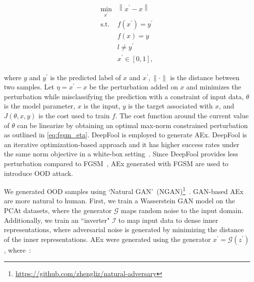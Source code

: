 \vspace{-6mm}
\begin{align}
    \begin{array}{cl}
        \min _{x^{\prime}} & \left\|x^{\prime}-x\right\| \\
        \text {s.t.} & f\left(x^{\prime}\right)=y^{\prime} \\
        & f(x)=y \\
        & l \neq y^{\prime} \\
        & x^{\prime} \in[0,1],
    \end{array}
\end{align}

\hspace*{3.5mm} where $y$ and $y^{\prime}$ is the predicted label of $x$ and $x^{\prime},\|\cdot\|$ is the distance between two samples. Let $\eta=x^{\prime}-x$ be the perturbation added on $x$ and minimizes the perturbation while misclassifying the prediction with a constraint of input data, ${\theta}$ is the model parameter, ${x}$ is the input, $y$ is the target associated with ${x}$, and $J(\theta, x,y)$ is the cost used to train $f$. The cost function around the current value of ${\theta}$ can be linearize by obtaining an optimal max-norm constrained perturbation as outlined in \cref{eq:fgsm_eta}. DeepFool is employed to generate AEx. DeepFool is an iterative optimization-based approach and it has higher success rates under the same norm objective in a white-box setting~\cite{yuan2019adversarial}. Since DeepFool provides less perturbation compared to FGSM~\cite{yuan2019adversarial}, AEx generated with FGSM are used to introduce OOD attack. 

\iffalse
We generated OOD samples
using `Natural GAN'~(NGAN)\footnote{\url{https://github.com/zhengliz/natural-adversary}}~\cite{zhao2017generating}. 
GAN-based AEx are more natural to human. First, we train a Wasserstein GAN model on the PCAt datasets, where the generator $\mathcal{G}$ maps random noise to the input domain. Additionally, we train an ``inverter" $\mathcal{I}$ to map input data to dense inner representations, where adversarial noise is generated by minimizing the distance of the inner representations. AEx were generated using the generator $  x^{\prime}=\mathcal{G}\left(z^{\prime}\right)$, where~\cite{OOD19,zhao2017generating}: 

